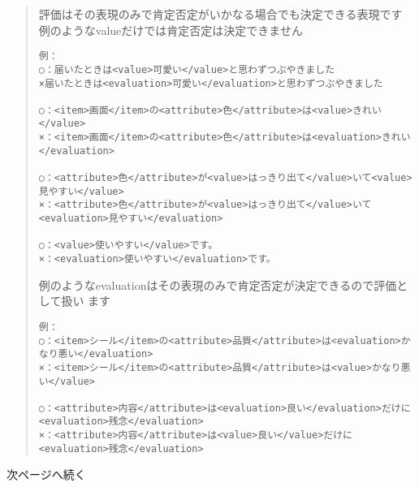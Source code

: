 \documentclass[japanese]{jnlp_1.4}
\begin{document}
\begin{screen}
\begin{quote}
評価はその表現のみで肯定否定がいかなる場合でも決定できる表現です\\
例のようなvalueだけでは肯定否定は決定できません
\begin{verbatim}
例：
○：届いたときは<value>可愛い</value>と思わずつぶやきました
×届いたときは<evaluation>可愛い</evaluation>と思わずつぶやきました

○：<item>画面</item>の<attribute>色</attribute>は<value>きれい</value>
×：<item>画面</item>の<attribute>色</attribute>は<evaluation>きれい</evaluation>

○：<attribute>色</attribute>が<value>はっきり出て</value>いて<value>見やすい</value>
×：<attribute>色</attribute>が<value>はっきり出て</value>いて<evaluation>見やすい</evaluation>

○：<value>使いやすい</value>です。
×：<evaluation>使いやすい</evaluation>です。
\end{verbatim}
\vspace{2\baselineskip}

例のようなevaluationはその表現のみで肯定否定が決定できるので評価として扱い\linebreak
ます
\begin{verbatim}
例：
○：<item>シール</item>の<attribute>品質</attribute>は<evaluation>かなり悪い</evaluation>
×：<item>シール</item>の<attribute>品質</attribute>は<value>かなり悪い</value>

○：<attribute>内容</attribute>は<evaluation>良い</evaluation>だけに<evaluation>残念</evaluation>
×：<attribute>内容</attribute>は<value>良い</value>だけに<evaluation>残念</evaluation>
\end{verbatim}
\end{quote}
\end{screen}
次ページへ続く
\end{document}
